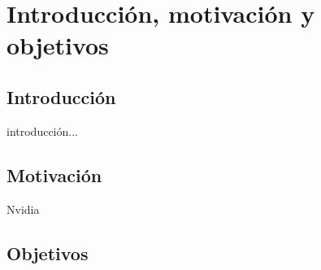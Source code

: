 \chapter{Introducción, motivación y objetivos}

\bigskip
\section{Introducción}
introducción...

\newpage
\section{Motivación}

\bigskip

Nvidia \cite{nvidiadeveloper} 



\section{Objetivos}







